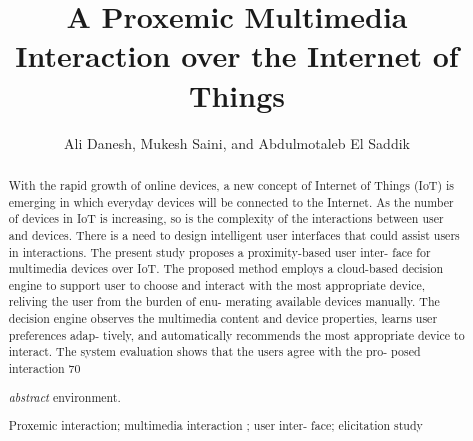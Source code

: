 \documentclass[runningheads,a4paper]{llncs}
\newcommand{\keywords}[1]{\par\addvspace\baselineskip
\noindent\keywordname\enspace\ignorespaces#1}
\begin{document}
\mainmatter  %

\title{A Proxemic Multimedia Interaction over the Internet of Things}


%
%
\author{Ali Danesh, Mukesh Saini, and Abdulmotaleb El Saddik }






%
%

\maketitle


\begin{abstract}

With the rapid growth of online devices, a new concept of Internet of Things (IoT) is emerging in which everyday devices will be connected to the Internet. As the number of devices in IoT is increasing, so is the complexity of the interactions between user and devices. There is a need to design intelligent user interfaces that could assist users in interactions. The present study proposes a proximity-based user inter- face for multimedia devices over IoT. The proposed method employs a cloud-based decision engine to support user to choose and interact with the most appropriate device, reliving the user from the burden of enu- merating available devices manually. The decision engine observes the multimedia content and device properties, learns user preferences adap- tively, and automatically recommends the most appropriate device to interact. The system evaluation shows that the users agree with the pro- posed interaction 70%

\emph{abstract} environment.
\keywords{Proxemic interaction; multimedia interaction ; user inter- face; elicitation study 
}
\end{abstract}
\end{document}
